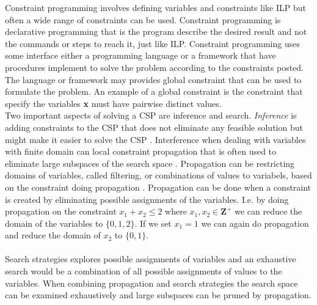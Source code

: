 Constraint programming involves defining variables and constraints like ILP but often a wide range of constraints can 
be used. Constraint programming is declarative programming that is the program describe the desired result 
and not the commands or steps to reach it, just like ILP. Constraint programming uses some interface either a 
programming language or a framework that have procedures implement to solve the problem according to the constraints 
posted. The language or framework may provides global constraint that can be used to formulate the problem. An example 
of a global constraint is the {} constraint that specify the variables \textbf{x} 
must have pairwise distinct values.  \\ 
Two important aspects of solving a CSP are inference and search. \emph{Inference} is adding constraints to the CSP that 
does not eliminate any feasible solution but might make it easier to solve the CSP \cite[p.301]{CPbog}. 
Interference when dealing with variables with finite domain can local constraint propagation that is often used to 
eliminate large subspaces of the search space . Propagation can be restricting 
domains of variables, called filtering, or combinations of values to variabels, based on the constraint doing 
propagation \cite[p. 169]{CPbog}. Propagation can be done when a constraint is created by eliminating possible 
assignments of the variables. I.e. by doing propagation on the constraint $x_1 + x_2 \leq 2$ where $x_1,x_2 \in 
\mathbf{Z}^+$ we can reduce the domain of the variables to $\{0,1,2\}$. If we set $x_1 =1$ we can again do propagation 
and reduce the domain of $x_2$ to $\{0,1\}$. \\  \\ 
Search strategies explores possible assignments of variables and an exhaustive search would be a combination of all 
possible assignments of values to the variables. When combining propagation and search strategies the search space can 
be examined exhaustively and large subspaces can be pruned by propagation. \\ 

